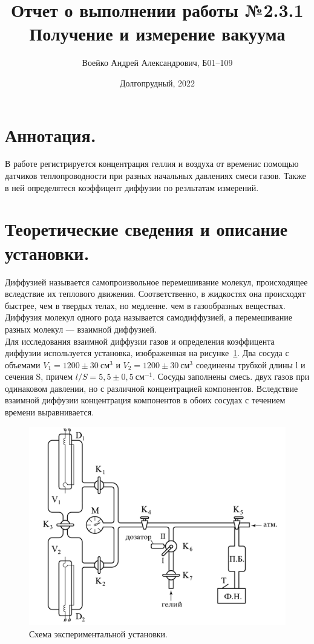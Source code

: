 \documentclass[a4paper,11pt]{article}
\title{Отчет о выполнении работы №2.3.1\\Получение и измерение вакуума}
\author{Воейко Андрей Александрович, Б01--109}
\date{Долгопрудный, 2022}
\begin{document}
\maketitle
\newpage
\section{Аннотация.}
В работе регистрируется концентрация геллия и воздуха от временис помощью датчиков теплопроводности при разных начальных давлениях смеси газов. Также в ней определятеся коэффицент диффузии по резльтатам измерений.
\section{Теоретические сведения и описание установки.}
Диффузией называется самопроизвольное перемешивание молекул, происходящее вследствие их теплового движения. Соответственно, в жидкостях она происходят быстрее, чем в твердых телах, но медленне. чем в газообразных веществах. Диффузия молекул одного рода называется самодиффузией, а перемешивание разных молекул --- взаимной диффузией.\\
Для исследования взаимной диффузии газов и определения коэффицента диффузии используется установка, изображенная на рисунке~\ref{fig:img1}. Два сосуда с объемами $V_{1} = 1200 \pm 30\ см^{3}$ и $V_{2} = 1200 \pm 30\ см^{3}$ соединены трубкой длины l и сечения S, причем $l/S = 5,5 \pm 0,5\ см^{-1}$. Сосуды заполнены смесь. двух газов при одинаковом давлении, но с различной концентрацией компонентов. Вследствие взаимной диффузии концентрация компонентов в обоих сосудах с течением времени выравнивается.
\begin{figure}[h!]\label{fig:img1}
  \centering
  \includegraphics[scale = 0.2691]{scheme1.png}
  \caption{Схема экспериментальной установки.}
\end{figure}
\end{document}
